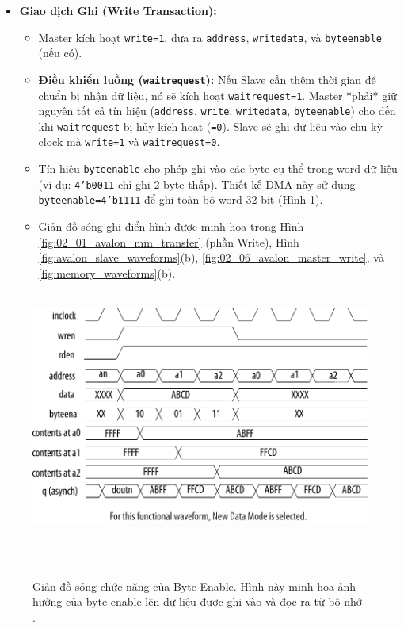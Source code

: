 \begin{itemize}
\begin{itemize}
        \end{itemize}
    \item \textbf{Giao dịch Ghi (Write Transaction):}
        \begin{itemize}
            \item Master kích hoạt \texttt{write=1}, đưa ra \texttt{address}, \texttt{writedata}, và \texttt{byteenable} (nếu có).
            \item \textbf{Điều khiển luồng (\texttt{waitrequest}):} Nếu Slave cần thêm thời gian để chuẩn bị nhận dữ liệu, nó sẽ kích hoạt \texttt{waitrequest=1}. Master *phải* giữ nguyên tất cả tín hiệu (\texttt{address}, \texttt{write}, \texttt{writedata}, \texttt{byteenable}) cho đến khi \texttt{waitrequest} bị hủy kích hoạt (\texttt{=0}). Slave sẽ ghi dữ liệu vào chu kỳ clock mà \texttt{write=1} và \texttt{waitrequest=0}.
            \item Tín hiệu \texttt{byteenable} cho phép ghi vào các byte cụ thể trong word dữ liệu (ví dụ: \texttt{4'b0011} chỉ ghi 2 byte thấp). Thiết kế DMA này sử dụng \texttt{byteenable=4'b1111} để ghi toàn bộ word 32-bit (Hình \ref{fig:02_02_memory_byteenable}).
            \item Giản đồ sóng ghi điển hình được minh họa trong Hình \ref{fig:02_01_avalon_mm_transfer} (phần Write), Hình \ref{fig:avalon_slave_waveforms}(b), \ref{fig:02_06_avalon_master_write}, và \ref{fig:memory_waveforms}(b).
        \end{itemize}
\end{itemize}

\begin{figure}[htbp]
    \centering
    \includegraphics[width=\linewidth]{Images/02_02_Memory_ByteEnable.pdf}
    \caption{Giản đồ sóng chức năng của Byte Enable. Hình này minh họa ảnh hưởng của byte enable lên dữ liệu được ghi vào và đọc ra từ bộ nhớ \cite{memory_byteenable}.}
    \label{fig:02_02_memory_byteenable} %
\end{figure}

